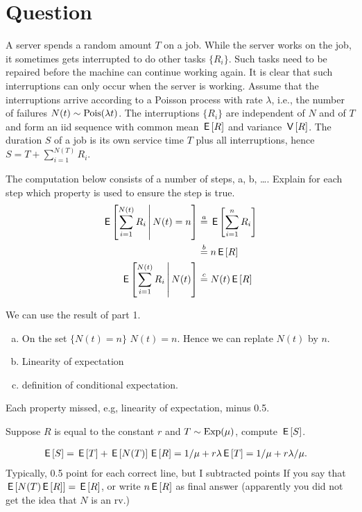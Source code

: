 \section{Question}


A server  spends a random amount $T$ on a job.
While the server works on the job, it sometimes gets interrupted to do other tasks $\{R_{i}\}$.
Such tasks need to be repaired before the machine can continue working again.
It is clear that such interruptions can only occur when the server is working.
Assume that the interruptions arrive according to a Poisson process with rate $\lambda$, i.e., the number of failures $N(t) \sim\mathrm{Pois}(\lambda t)$.
The interruptions $\{R_{i}\}$ are independent of $N$ and of $T$ and form an iid sequence with common mean $\,\mathsf{E}\left[R\right]$ and variance $\,\mathsf{V}\left[R\right]$.
The  duration $S$ of a job  is its own service time $T$ plus all interruptions, hence $S = T+ \sum_{i=1}^{N(T)} R_{i}$.

\begin{exercise}[1.5]
The computation below consists of a number of steps, a, b, \ldots. Explain for each step which property is used to ensure the step is true.
\begin{align}
\,\mathsf{E}\left[\sum_{i=1}^{N(t)} R_{i}\,\middle|\, N(t)= n\right] &\stackrel{a}{=} \,\mathsf{E}\left[\sum_{i=1}^{n} R_{i}\right] \\
  &\stackrel{b}{=} n \,\mathsf{E}\left[R\right] \\
\,\mathsf{E}\left[\sum_{i=1}^{N(t)} R_{i}\,\middle|\, N(t)\right] &\stackrel{c}{=} N(t) \,\mathsf{E}\left[R\right]
\end{align}
\begin{solution}
  We can use the result of part 1.
  \begin{enumerate}[a.]
  \item  On the set $\{N(t)=n\}$ $N(t)=n$. Hence we can replate  $N(t)$ by $n$.
  \item  Linearity of expectation
  \item  definition of conditional expectation.
  \end{enumerate}
Each  property missed, e.g, linearity of expectation, minus 0.5.
\end{solution}
\end{exercise}

\begin{exercise}[2]
  Suppose $R$ is equal to the constant $r$ and $T\sim\mathrm{Exp}(\mu)$, compute $\,\mathsf{E}\left[S\right]$.
\begin{solution}
    \begin{align*}
      \,\mathsf{E}\left[S\right] &= \,\mathsf{E}\left[T\right]  + \,\mathsf{E}\left[N(T)\right]\,\mathsf{E}\left[R\right]= 1/\mu+ r \lambda \,\mathsf{E}\left[T\right] = 1/\mu + r \lambda /\mu.
    \end{align*}
Typically, 0.5 point for each correct line, but I subtracted points If you say that $\,\mathsf{E}\left[N(T) \,\mathsf{E}\left[R\right]\right] = \,\mathsf{E}\left[R\right]$, or write $n\,\mathsf{E}\left[R\right]$ as final answer (apparently you did not get the idea that $N$ is an rv.)

\end{solution}
\end{exercise}


